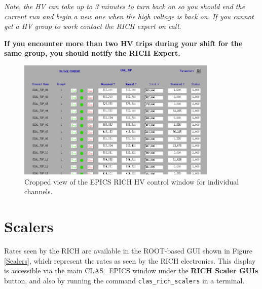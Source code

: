 \documentclass[12pt]{article}
\begin{document}
      {\em Note, the HV can take up to 3 minutes to turn back on so you should end the current run and begin a new one when the high voltage is back on. If you cannot get a HV group to work contact the RICH expert on call.}

      {\bf If you encounter more than two HV trips during your shift for the same group, you should notify the RICH Expert.}

\begin{figure}[htbp]
\center
\includegraphics[width=0.85\textwidth]{pics/ecalhv_setting_2014_12_15-SUBSET.png}
\caption{ \label{HVControl} Cropped view of the EPICS RICH HV control window for individual channels.}
\end{figure}

\clearpage
{\color{blue}

\newpage
      \section{Scalers}
}
      Rates seen by the RICH are available in the ROOT-based GUI shown in Figure \ref{Scalers}, which represent the rates as seen by the RICH electronics.  This display is accessible via the main CLAS\_EPICS window under the {\bf RICH Scaler GUIs} button, and also by running the command \texttt{clas\_rich\_scalers} in a terminal. 
 
      
\end{document}
